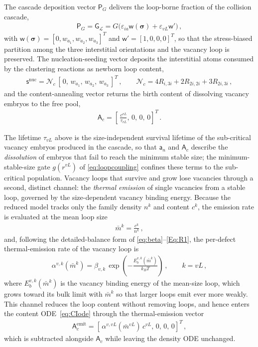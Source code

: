 \documentclass{article}
\newcommand{\spvec}[1]{\bm{\mathsf{#1}}}   %
\begin{document}
The cascade deposition vector $\spvec{P}_G$ delivers the loop-borne fraction of the collision cascade,
\begin{align}\label{eq:PG}
\spvec{P}_G=\spvec{G}_{\mathcal{L}}=G\big(\varepsilon_{ia}\spvec{w}(\bm\sigma)+\varepsilon_{vL}\spvec{w}'\big)\, ,
\end{align}
with $\spvec{w}(\bm\sigma)=[0,w_{a_1},w_{a_2},w_{a_3}]^T$ and $\spvec{w}'=[1,0,0,0]^T$, so that the stress-biased partition among the three interstitial orientations and the vacancy loop is preserved. The nucleation-seeding vector deposits the interstitial atoms consumed by the clustering reactions as newborn loop content,
\begin{align}
\spvec{s}^{\mathrm{nuc}}=\mathcal{N}_c\,[\,0,\,w_{a_1},\,w_{a_2},\,w_{a_3}\,]^T\, ,\qquad
\mathcal{N}_c=4R_{i,3i}+2R_{2i,2i}+3R_{2i,3i}\, ,
\end{align}
and the content-annealing vector returns the birth content of dissolving vacancy embryos to the free pool,
\begin{align}
\spvec{A}_c=\left[\,\frac{c^{vL}}{\tau_{vL}},\,0,\,0,\,0\right]^T\, .
\end{align}

The lifetime $\tau_{vL}$ above is the size-independent survival lifetime of the sub-critical vacancy embryos produced in the cascade, so that $\spvec{a}_n$ and $\spvec{A}_c$ describe the \emph{dissolution} of embryos that fail to reach the minimum stable size; the minimum-stable-size gate $g(r^{vL})$ of \eqref{eq:loopcoupling} confines these terms to the sub-critical population. Vacancy loops that survive and grow lose vacancies through a second, distinct channel: the \emph{thermal emission} of single vacancies from a stable loop, governed by the size-dependent vacancy binding energy. Because the reduced model tracks only the family density $n^{k}$ and content $c^{k}$, the emission rate is evaluated at the mean loop size
\begin{align}\label{eq:meanloopsize}
\bar m^{k}=\frac{c^{k}}{n^{k}}\, ,
\end{align}
and, following the detailed-balance form of \eqref{eq:beta}--\eqref{Eq:R1}, the per-defect thermal-emission rate of the vacancy loop is
\begin{align}\label{eq:loopemission}
\alpha^{v,k}(\bar m^{k})=\beta_{v,k}\,\exp\!\left(-\frac{E_b^{v,k}(\bar m^{k})}{k_BT}\right)\, ,\qquad k=vL\, ,
\end{align}
where $E_b^{v,k}(\bar m^{k})$ is the vacancy binding energy of the mean-size loop, which grows toward its bulk limit with $\bar m^{k}$ so that larger loops emit ever more weakly. This channel reduces the loop content without removing loops, and hence enters the content ODE~\eqref{eq:CIode} through the thermal-emission vector
\begin{align}\label{eq:Aemit}
\spvec{A}_c^{\mathrm{emit}}=\left[\,\alpha^{v,vL}(\bar m^{vL})\,c^{vL},\,0,\,0,\,0\right]^T\, ,
\end{align}
which is subtracted alongside $\spvec{A}_c$ while leaving the density ODE unchanged.
\end{document}
